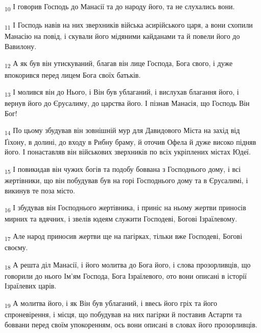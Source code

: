 \begin{tcolorbox}
\textsubscript{10} І говорив Господь до Манасії та до народу його, та не слухались вони.
\end{tcolorbox}
\begin{tcolorbox}
\textsubscript{11} І Господь навів на них зверхників війська асирійського царя, а вони схопили Манасію на повід, і скували його мідяними кайданами та й повели його до Вавилону.
\end{tcolorbox}
\begin{tcolorbox}
\textsubscript{12} А як був він утискуваний, благав він лице Господа, Бога свого, і дуже впокорився перед лицем Бога своїх батьків.
\end{tcolorbox}
\begin{tcolorbox}
\textsubscript{13} І молився він до Нього, і Він був ублаганий, і вислухав благання його, і вернув його до Єрусалиму, до царства його. І пізнав Манасія, що Господь Він Бог!
\end{tcolorbox}
\begin{tcolorbox}
\textsubscript{14} По цьому збудував він зовнішній мур для Давидового Міста на захід від Ґіхону, в долині, до входу в Рибну браму, й оточив Офела й дуже високо підняв його. І понаставляв він військових зверхників по всіх укріплених містах Юдеї.
\end{tcolorbox}
\begin{tcolorbox}
\textsubscript{15} І повикидав він чужих богів та подобу боввана з Господнього дому, і всі жертівники, що він побудував був на горі Господнього дому та в Єрусалимі, і викинув те поза місто.
\end{tcolorbox}
\begin{tcolorbox}
\textsubscript{16} І збудував він Господнього жертівника, і приніс на ньому жертви приносів мирних та вдячних, і звелів юдеям служити Господеві, Богові Ізраїлевому.
\end{tcolorbox}
\begin{tcolorbox}
\textsubscript{17} Але народ приносив жертви ще на пагірках, тільки вже Господеві, Богові своєму.
\end{tcolorbox}
\begin{tcolorbox}
\textsubscript{18} А решта діл Манасії, і його молитва до Бога його, і слова прозорливців, що говорили до нього Ім'ям Господа, Бога Ізраїлевого, ото вони описані в історії Ізраїлевих царів.
\end{tcolorbox}
\begin{tcolorbox}
\textsubscript{19} А молитва його, і як Він був ублаганий, і ввесь його гріх та його спроневірення, і місця, що побудував на них пагірки й поставив Астарти та боввани перед своїм упокоренням, ось вони описані в словах його прозорливців.
\end{tcolorbox}
